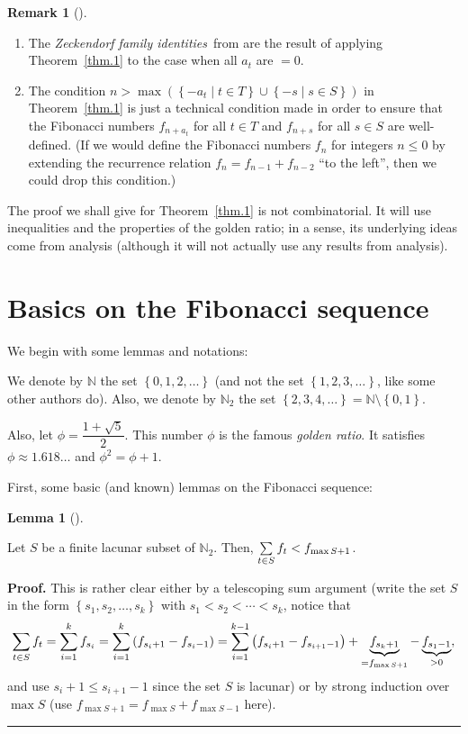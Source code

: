 \documentclass[numbers=enddot,12pt,final,onecolumn,notitlepage]{scrartcl}%
\numberwithin{exer}{section}
\theoremstyle{definition}
\newtheorem{lem}[theo]{Lemma}
\newenvironment{lemma}[1][]
{\begin{lem}[#1]\begin{leftbar}}
{\end{leftbar}\end{lem}}
\newtheorem{remk}[theo]{Remark}
\newenvironment{remark}[1][]
{\begin{remk}[#1]\begin{leftbar}}
{\end{leftbar}\end{remk}}
\newenvironment{proof}[1][Proof]{\noindent\textbf{#1.} }{\ \rule{0.5em}{0.5em}}
\let\sumnonlimits\sum
\renewcommand{\sum}{\sumnonlimits\limits}
\begin{document}
\begin{remark}
\begin{enumerate}
\item The \textit{Zeckendorf family identities}\ from \cite{1} are the result
of applying Theorem~\ref{thm.1} to the case when all $a_{t}$ are $=0$.

\item The condition $n>\max\left(  \left\{  -a_{t}\mid t\in T\right\}
\cup\left\{  -s\mid s\in S\right\}  \right)  $ in Theorem~\ref{thm.1} is just
a technical condition made in order to ensure that the Fibonacci numbers
$f_{n+a_{t}}$ for all $t\in T$ and $f_{n+s}$ for all $s\in S$ are
well-defined. (If we would define the Fibonacci numbers $f_{n}$ for integers
$n\leq0$ by extending the recurrence relation $f_{n}=f_{n-1}+f_{n-2}$ ``to the
left'', then we could drop this condition.)
\end{enumerate}
\end{remark}

The proof we shall give for Theorem~\ref{thm.1} is not combinatorial. It will
use inequalities and the properties of the golden ratio; in a sense, its
underlying ideas come from analysis (although it will not actually use any
results from analysis).

\section{Basics on the Fibonacci sequence}

We begin with some lemmas and notations:

We denote by $\mathbb{N}$ the set $\left\{  0,1,2,\ldots\right\}  $ (and not
the set $\left\{  1,2,3,\ldots\right\}  $, like some other authors do). Also,
we denote by $\mathbb{N}_{2}$ the set $\left\{  2,3,4,\ldots\right\}
=\mathbb{N}\setminus\left\{  0,1\right\}  $.

Also, let $\phi=\dfrac{1+\sqrt{5}}{2}$. This number $\phi$ is the famous
\textit{golden ratio}. It satisfies $\phi\approx1.618\ldots$ and $\phi
^{2}=\phi+1$.

First, some basic (and known) lemmas on the Fibonacci sequence:

\begin{lemma}
\label{lem.2} Let $S$ be a finite lacunar subset of $\mathbb{N}_{2}$. Then,
$\sum\limits_{t\in S}f_{t}<f_{\max S+1}$.
\end{lemma}

\begin{proof}
This is rather clear either by a telescoping sum argument (write the set $S$
in the form $\left\{  s_{1},s_{2},\ldots,s_{k}\right\}  $ with $s_{1}%
<s_{2}<\cdots<s_{k}$, notice that
\[
\sum\limits_{t\in S}f_{t}=\sum\limits_{i=1}^{k}f_{s_{i}}=\sum\limits_{i=1}%
^{k}\left(  f_{s_{i}+1}-f_{s_{i}-1}\right)  =\sum\limits_{i=1}^{k-1}\left(
f_{s_{i}+1}-f_{s_{i+1}-1}\right)  +\underbrace{f_{s_{k}+1}}_{=f_{\max S+1}%
}-\underbrace{f_{s_{1}-1}}_{>0},
\]
and use $s_{i}+1\leq s_{i+1}-1$ since the set $S$ is lacunar) or by strong
induction over $\max S$ (use $f_{\max S+1}=f_{\max S}+f_{\max S-1}$ here).
\end{proof}
\end{document}
